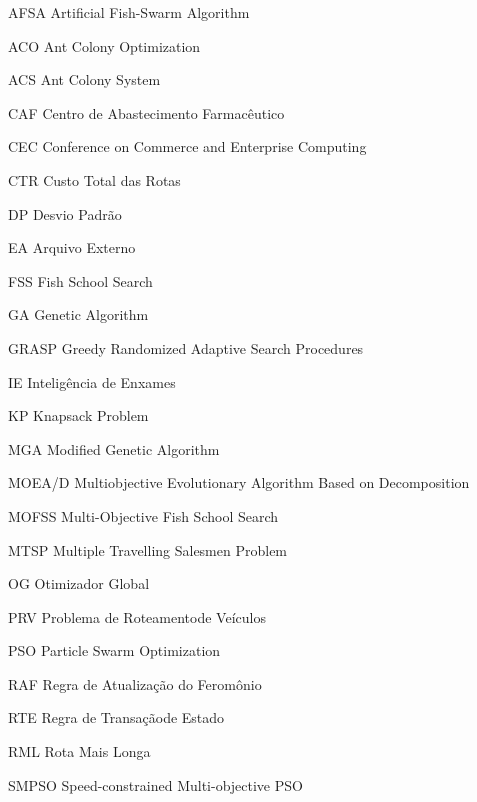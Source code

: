 \begin{siglas}
	

  \item[AFSA] Artificial Fish-Swarm Algorithm
  \item[ACO] Ant Colony Optimization
  \item[ACS] Ant Colony System 
  \item[CAF] Centro de Abastecimento Farmacêutico
  \item[CEC] Conference on Commerce and Enterprise Computing 
  \item[CTR] Custo Total das Rotas
  \item[DP] Desvio Padrão 
  \item[EA] Arquivo Externo
  \item[FSS] Fish School Search
  \item[GA] Genetic Algorithm
  \item[GRASP] Greedy Randomized Adaptive Search Procedures
  \item[IE] Inteligência de Enxames
  \item[KP] Knapsack Problem
  \item[MGA] Modified Genetic Algorithm
  \item[MOEA/D] Multiobjective Evolutionary Algorithm Based on Decomposition
  \item[MOFSS] Multi-Objective Fish School Search
  \item[MTSP] Multiple Travelling Salesmen Problem
  \item[OG] Otimizador Global
  \item[PRV] Problema de Roteamentode Veículos
  \item[PSO] Particle Swarm Optimization
  \item[RAF] Regra de Atualização do Feromônio
  \item[RTE] Regra de Transaçãode Estado
  \item[RML] Rota Mais Longa
  \item[SMPSO] Speed-constrained Multi-objective PSO

\end{siglas}
